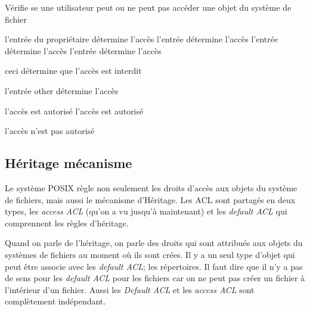 \begin{algorithm}
\caption{Vérifie se une utilisateur peut ou ne peut pas accéder une objet du système de fichier}
\label{algacl}
\begin{algorithmic}
\STATE l'entrée du propriétaire détermine l'accès
\STATE l'entrée détermine l'accès
\STATE l'entrée détermine l'accès
\STATE l'entrée détermine l'accès
 
\STATE ceci détermine que l'accès est interdit
 
\ELSE
\STATE l'entrée other détermine l'accès
\ENDIF
 
%
\STATE 
l'accès est autorisé
\STATE l'accès est autorisé
 
\ELSE
\STATE l'accès n'est pas autorisé
\ENDIF
\end{algorithmic}
\end{algorithm}
 
 
\subsection*{Héritage mécanisme}
 
Le système POSIX règle non seulement les droits d'accès aux objets du système de fichiers, mais aussi le mécanisme d'Héritage. Les ACL sont partagés en deux types, les \emph{access ACL} (qu'on a vu jusqu'à maintenant) et les \emph{default ACL} qui comprennent les règles d'héritage.
 
Quand on parle de l'héritage, on parle des droits qui sont attribués aux objets du systèmes de fichiers au moment où ils sont crées. Il y a un seul type d'objet qui peut être associe avec les \emph{default ACL}; les répertoires. Il faut dire que il n'y a pas de sens pour les \emph{default ACL } pour les fichiers car on ne peut pas créer un fichier à l'intérieur d'un fichier. Aussi les \emph{Default ACL} et les \emph{access ACL} sont complètement indépendant.
 
